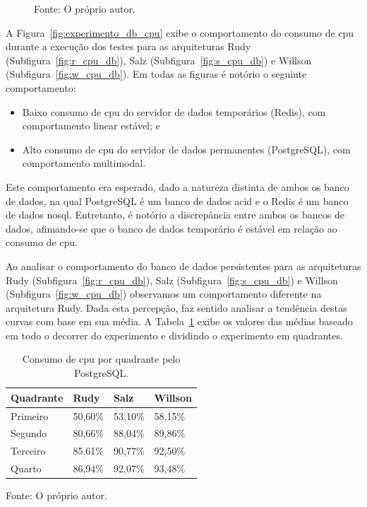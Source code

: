 \begin{figure}[htb!]
    Fonte: O próprio autor.
\end{figure}


A Figura~\ref{fig:experimento_db_cpu} exibe o comportamento do consumo de \ac{cpu} durante a execução dos testes para as arquiteturas Rudy (Subfigura~\ref{fig:r_cpu_db}), Salz (Subfigura~\ref{fig:s_cpu_db}) e Willson (Subfigura~\ref{fig:w_cpu_db}).
%
Em todas as figuras é notório o seguinte comportamento:

\begin{itemize}
 \item Baixo consumo de \ac{cpu} do servidor de dados temporários (Redis), com comportamento linear estável; e
 \item Alto consumo de \ac{cpu} do servidor de dados permanentes (PostgreSQL), com comportamento multimodal.
\end{itemize}

Este comportamento era esperado, dado a natureza distinta de ambos os banco de dados, na qual PostgreSQL é um banco de dados \ac{acid} e o Redis é um banco de dados \ac{nosql}.
%
Entretanto, é notório a discrepância entre ambos os bancos de dados, afimando-se que o banco de dados temporário é estável em relação ao consumo de \ac{cpu}.

Ao analisar o comportamento do banco de dados persistentes para as arquiteturas Rudy (Subfigura~\ref{fig:r_cpu_db}), Salz (Subfigura~\ref{fig:s_cpu_db}) e Willson (Subfigura~\ref{fig:w_cpu_db}) observamos um comportamento diferente na arquitetura Rudy.
%
Dada esta percepção, faz sentido analisar a tendência destas curvas com base em sua média.
%
A Tabela~\ref{tab:cpu_db_media_quadrantes} exibe os valores das médias baseado em todo o decorrer do experimento e dividindo o experimento em quadrantes.

\begin{table}[htb!]
\centering
\begin{adjustbox}{max width=\textwidth}
\caption{Consumo de \ac{cpu} por quadrante pelo PostgreSQL.}
\label{tab:cpu_db_media_quadrantes}
\begin{tabular}{l|l|l|l}

\hline \hline

Quadrante & Rudy    & Salz    & Willson \\ \hline \hline

Primeiro  & 50,60\% & 53,10\% & 58,15\% \\ \hline

Segundo   & 80,66\% & 88,04\% & 89,86\% \\ \hline

Terceiro  & 85,61\% & 90,77\% & 92,50\% \\ \hline

Quarto    & 86,94\% & 92,07\% & 93,48\% \\ \hline \hline

\end{tabular}

\end{adjustbox}

Fonte: O próprio autor.
\end{table}


